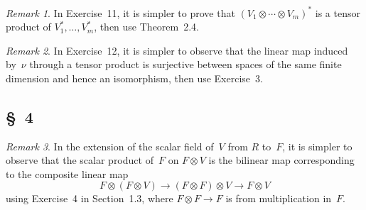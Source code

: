 \documentclass[letterpaper,12pt]{article}
\newcommand{\tprod}{\otimes}
\newcommand{\dual}[1]{#1^*}
\newcommand{\multi}[4]{#2_{#3}#1\cdots#1#2_{#4}}
\newcommand{\tprods}[3]{\multi{\tprod}{#1}{#2}{#3}}
\theoremstyle{definition}
\theoremstyle{remark}
\newtheorem*{rmk}{Remark}
\begin{document}
\begin{rmk}
In Exercise~11, it is simpler to prove that \(\dual{(\tprods{V}{1}{m})}\) is a tensor product of \(\dual{V_1},\ldots,\dual{V_m}\), then use Theorem~2.4.
\end{rmk}

\begin{rmk}
In Exercise~12, it is simpler to observe that the linear map induced by~\(\nu\) through a tensor product is surjective between spaces of the same finite dimension and hence an isomorphism, then use Exercise~3.
\end{rmk}

\subsection*{\S~4}
\begin{rmk}
In the extension of the scalar field of~\(V\) from \(R\) to~\(F\), it is simpler to observe that the scalar product of~\(F\) on \(F\tprod V\) is the bilinear map corresponding to the composite linear map
\[F\tprod(F\tprod V)\to(F\tprod F)\tprod V\to F\tprod V\]
using Exercise~4 in Section~1.3, where \(F\tprod F\to F\) is from multiplication in~\(F\).
\end{rmk}
\end{document}
